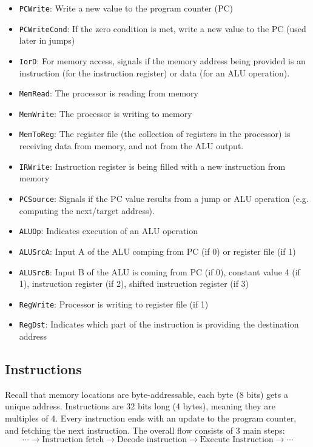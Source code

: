 \begin{itemize}
    \item \texttt{PCWrite}: Write a new value to the program counter (PC)
    \item \texttt{PCWriteCond}: If the zero condition is met, write a new value to the PC (used later in jumps)
    \item \texttt{IorD}: For memory access, signals if the memory address being provided is an instruction (for the instruction register) or data (for an ALU operation).
    \item \texttt{MemRead}: The processor is reading from memory
    \item \texttt{MemWrite}: The processor is writing to memory
    \item \texttt{MemToReg}: The register file (the collection of registers in the processor) is receiving data from memory, and not from the ALU output.
    \item \texttt{IRWrite}: Instruction register is being filled with a new instruction from memory
    \item \texttt{PCSource}: Signals if the PC value results from a jump or ALU operation (e.g. computing the next/target address).
    \item \texttt{ALUOp}: Indicates execution of an ALU operation
    \item \texttt{ALUSrcA}: Input A of the ALU comping from PC (if 0) or register file (if 1)
    \item \texttt{ALUSrcB}: Input B of the ALU is coming from PC (if 0), constant value 4 (if 1), instruction register (if 2), shifted instruction register (if 3)
    \item \texttt{RegWrite}: Processor is writing to register file (if 1)
    \item \texttt{RegDst}: Indicates which part of the instruction is providing the destination address
\end{itemize}

\subsection{Instructions}

Recall that memory locations are byte-addressable, each byte (8 bits) gets a unique address. Instructions are 32 bits long (4 bytes), meaning they are multiples of 4. Every instruction ends with an update to the program counter, and fetching the next instruction. The overall flow consists of 3 main steps:
\[
\cdots \to \text{Instruction fetch} \to \text{Decode instruction} \to \text{Execute Instruction} \to \cdots
\]

